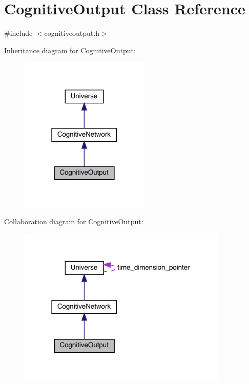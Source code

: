 \hypertarget{class_cognitive_output}{}\section{Cognitive\+Output Class Reference}
\label{class_cognitive_output}


{\ttfamily \#include $<$cognitiveoutput.\+h$>$}



Inheritance diagram for Cognitive\+Output\+:\nopagebreak
\begin{figure}[H]
\begin{center}
\leavevmode
\includegraphics[width=175pt]{class_cognitive_output__inherit__graph}
\end{center}
\end{figure}


Collaboration diagram for Cognitive\+Output\+:
\nopagebreak
\begin{figure}[H]
\begin{center}
\leavevmode
\includegraphics[width=283pt]{class_cognitive_output__coll__graph}
\end{center}
\end{figure}
